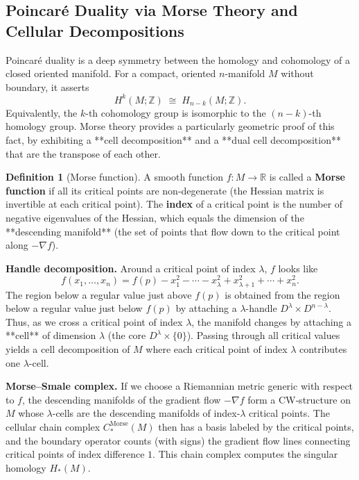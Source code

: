 \documentclass{article}
\theoremstyle{definition}
\newtheorem{definition}{Definition}[section]
\begin{document}
\subsection{Poincaré Duality via Morse Theory and Cellular Decompositions}
Poincaré duality is a deep symmetry between the homology and cohomology of a closed oriented manifold.  
For a compact, oriented \(n\)-manifold \(M\) without boundary, it asserts
\[
H^k(M;\mathbb{Z}) \;\cong\; H_{n-k}(M;\mathbb{Z}).
\]
Equivalently, the \(k\)-th cohomology group is isomorphic to the \((n-k)\)-th homology group.  
Morse theory provides a particularly geometric proof of this fact, by exhibiting a **cell decomposition**  and a **dual cell decomposition** that are the transpose of each other.

\begin{definition}[Morse function]
A smooth function \(f:M\to \mathbb{R}\) is called a \textbf{Morse function} if all its critical points are non‑degenerate (the Hessian matrix is invertible at each critical point).  
The \textbf{index} of a critical point is the number of negative eigenvalues of the Hessian, which equals the dimension of the **descending manifold** (the set of points that flow down to the critical point along \(-\nabla f\)).
\end{definition}

\textbf{Handle decomposition.}  
Around a critical point of index \(\lambda\), \(f\) looks like
\[
f(x_1,\dots,x_n) = f(p) - x_1^2 - \cdots - x_\lambda^2 + x_{\lambda+1}^2 + \cdots + x_n^2.
\]
The region below a regular value just above \(f(p)\) is obtained from the region below a regular value just below \(f(p)\) by attaching a \(\lambda\)-handle \(D^\lambda \times D^{n-\lambda}\).  
Thus, as we cross a critical point of index \(\lambda\), the manifold changes by attaching a **cell** of dimension \(\lambda\) (the core \(D^\lambda \times \{0\}\)).  
Passing through all critical values yields a cell decomposition of \(M\) where each critical point of index \(\lambda\) contributes one \(\lambda\)-cell.

\textbf{Morse–Smale complex.}  
If we choose a Riemannian metric generic with respect to \(f\), the descending manifolds of the gradient flow \(-\nabla f\) form a CW‑structure on \(M\) whose \(\lambda\)-cells are the descending manifolds of index‑\(\lambda\) critical points.  
The cellular chain complex \(C^{\text{Morse}}_*(M)\) then has a basis labeled by the critical points, and the boundary operator counts (with signs) the gradient flow lines connecting critical points of index difference \(1\).  
This chain complex computes the singular homology \(H_*(M)\).
\end{document}
